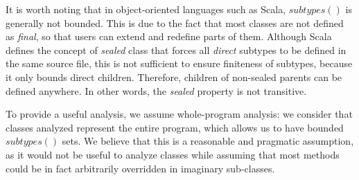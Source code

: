 It is worth noting that in object-oriented languages such as Scala,
$subtypes()$ is generally not bounded. This is due to the fact that most
classes are not defined as \emph{final}, so that users can extend and redefine
parts of them. Although Scala defines the concept of \emph{sealed} class that
forces all \emph{direct} subtypes to be defined in the same source file, this
is not sufficient to ensure finiteness of subtypes, because it only bounds
direct children. Therefore, children of non-sealed parents can be defined
anywhere. In other words, the \emph{sealed} property is not transitive.

To provide a useful analysis, we assume whole-program analysis: we consider
that classes analyzed represent the entire program, which allows us to have
bounded $subtypes()$ sets. We believe that this is a reasonable and pragmatic
assumption, as it would not be useful to analyze classes while assuming that
most methods could be in fact arbitrarily overridden in imaginary sub-classes.
